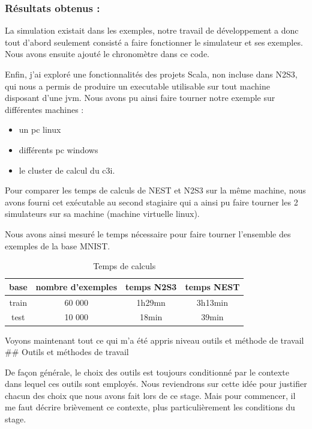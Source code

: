 \hypertarget{ruxe9sultats-obtenus}{%
\subsubsection{Résultats obtenus :}\label{ruxe9sultats-obtenus}}

La simulation existait dans les exemples, notre travail de développement
a donc tout d'abord seulement consisté a faire fonctionner le simulateur
et ses exemples. Nous avons ensuite ajouté le chronomètre dans ce code.

Enfin, j'ai exploré une fonctionnalités des projets Scala, non incluse
dans N2S3, qui nous a permis de produire un executable utilisable sur
tout machine disposant d'une jvm. Nous avons pu ainsi faire tourner
notre exemple sur différentes machines :

\begin{itemize}
\tightlist
\item
  un pc linux
\item
  différents pc windows
\item
  le cluster de calcul du c3i.
\end{itemize}

Pour comparer les temps de calculs de NEST et N2S3 sur la même machine,
nous avons fourni cet exécutable au second stagiaire qui a ainsi pu
faire tourner les 2 simulateurs sur sa machine (machine virtuelle
linux).

Nous avons ainsi mesuré le temps nécessaire pour faire tourner
l'ensemble des exemples de la base MNIST.

\begin{table}[h!]
\centering
\begin{tabular}{|c|c|c|c|}
\hline
base & nombre d'exemples & temps N2S3 & temps NEST \\
\hline
train & 60 000 & 1h29mn & 3h13min \\
\hline
test & 10 000 & 18min & 39min \\
\hline
\end{tabular}
\caption{\label{tab:tempsMnist} Temps de calculs}
\end{table}

Voyons maintenant tout ce qui m'a été appris niveau outils et méthode de
travail \#\# Outils et méthodes de travail

De façon générale, le choix des outils est toujours conditionné par le
contexte dans lequel ces outils sont employés. Nous reviendrons sur
cette idée pour justifier chacun des choix que nous avons fait lors de
ce stage. Mais pour commencer, il me faut décrire brièvement ce
contexte, plus particulièrement les conditions du stage.

